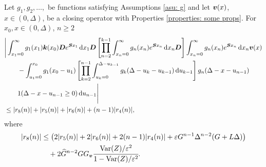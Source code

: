\begin{cor} \label{cor: aaaaa}
	Let \(g_1,g_2,\dots,\) be functions satisfying Assumptions \ref{asu: g} and let \({\boldsymbol v}(x)\), \(x\in(0,\Delta)\), be a closing operator with Properties \ref{properties: some props}. For \(x_0,x\in(0,\Delta)\), \(n\geq 2\)
	\begin{align}
		&\Bigg| \int_{x_1=0}^\infty g_1(x_1) \boldsymbol k(x_0) \boldsymbol D e^{\boldsymbol{S}x_1}\, \mathrm{d} x_1\boldsymbol D 
            	\left[\prod_{n=2}^{k-1}\int_{x_n=0}^\infty g_n(x_n) e^{\boldsymbol{S}x_n} \, \mathrm{d} x_n
		\boldsymbol D\right]
            	\int_{x_n=0}^\infty g_{n}(x_n) e^{\boldsymbol{S}x_n} \, \mathrm{d} x_n {\boldsymbol v}(x) \nonumber 
		\\&\qquad {}- \int_{u_1=0}^{x_0}g_1(x_0 - u_1)
		\left[\prod_{k=2}^{n-1} \int_{u_k=0}^{\Delta-u_{k-1}} g_k(\Delta-u_k-u_{k-1})\, \mathrm{d} u_{k-1}\right] \nonumber 
            	g_{n}(\Delta - x-u_{n-1})
	\\&\qquad{} 1(\Delta-x-u_{n-1}\geq0)\, \mathrm{d} u_{n-1} \Bigg| \nonumber
		\\&\leq |r_8(n)|+|r_5(n)|+|r_6(n)| + (n-1)|r_4(n)|,\label{eqn: KAFnn}
	\end{align}
	where 
	\begin{align}
		|r_8(n)|&\leq \left( 2|r_5(n)| + 2|r_6(n)| + 2(n-1)|r_4(n)| + \varepsilon G^{n-1}\Delta^{n-2}(G+L\Delta) \right) \\&\quad{} 
	+2\widehat G^{n-2}GG_{\boldsymbol v}\cfrac{\mathrm{Var}(Z)/\varepsilon^2}{1-\mathrm{Var}(Z)/\varepsilon^2}.
	\end{align}
\end{cor}
